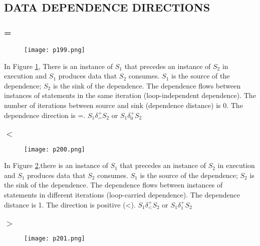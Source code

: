 \subsection{DATA DEPENDENCE DIRECTIONS}

\subsubsection{ = }

\begin{figure}[H]
	\centering
	\texttt{[image: p199.png]}
	\caption{}
	\label{fig:p199}
\end{figure}


In Figure \ref{fig:p199}, There is an instance of $S_1$ that precedes an instance of $S_2$ in
execution and $S_1$ produces data that $S_2$ consumes.
$S_1$ is the {\color{red}source} of the dependence; $S_2$ is the {\color{red}sink} of the
dependence.
The dependence flows between instances of statements in the
same iteration ({\color{red}loop-independent} dependence).
The number of iterations between source and sink (dependence
distance) is 0. The {\color{red}dependence direction} is {\color{red}=}.
$S_1 \delta^{+}_{=} S_2$ or $S_1 \delta^{+}_{0} S_2$

\subsubsection{$<$}

\begin{figure}[H]
	\centering
	\texttt{[image: p200.png]}
	\caption{}
	\label{fig:p200}
\end{figure}

In Figure \ref{fig:p200},there is an instance of $S_1$ that precedes an instance of $S_2$ in
execution and $S_1$ produces data that $S_2$ consumes.
$S_1$ is the source of the dependence; $S_2$ is the sink of the
dependence.
The dependence flows between instances of statements in
different iterations (loop-carried dependence).
The dependence distance is 1. The direction is positive (<).
$S_1 \delta^{+}_{<} S_2$ or $S_1 \delta^{+}_{1} S_2$


\subsubsection{$>$}

\begin{figure}[H]
	\centering
	\texttt{[image: p201.png]}
	\caption{}
	\label{fig:p201}
\end{figure}

